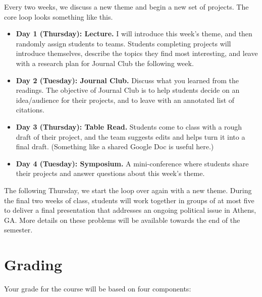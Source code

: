 \documentclass[11pt, letterpaper]{article}
\begin{document}
Every two weeks, we discuss a new theme and begin a new set of projects. The core loop looks something like this. 

\begin{itemize}
	\item \textbf{Day 1 (Thursday): Lecture.} I will introduce this week's theme, and then randomly assign students to teams. Students completing projects will introduce themselves, describe the topics they find most interesting, and leave with a research plan for Journal Club the following week.
	\item \textbf{Day 2 (Tuesday): Journal Club.} Discuss what you learned from the readings. The objective of Journal Club is to help students decide on an idea/audience for their projects, and to leave with an annotated list of citations. 
	\item \textbf{Day 3 (Thursday): Table Read.} Students come to class with a rough draft of their project, and the team suggests edits and helps turn it into a final draft. (Something like a shared Google Doc is useful here.)
	\item \textbf{Day 4 (Tuesday): Symposium.} A mini-conference where students share their projects and answer questions about this week's theme.
\end{itemize}

\noindent The following Thursday, we start the loop over again with a new theme. During the final two weeks of class, students will work together in groups of at most five to deliver a final presentation that addresses an ongoing political issue in Athens, GA. More details on these problems will be available towards the end of the semester. 

\section*{Grading}

Your grade for the course will be based on four components:
\end{document}

